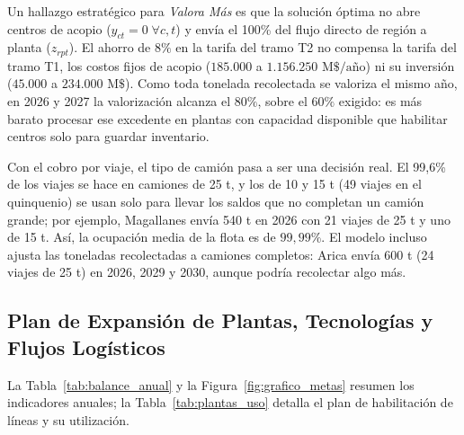 \documentclass[letterpaper]{article}
\begin{document}
Un hallazgo estratégico para \textit{Valora Más} es que la solución óptima no abre centros de acopio ($y_{ct}=0\;\forall c,t$) y envía el 100\% del flujo directo de región a planta ($z_{rpt}$). El ahorro de $8\%$ en la tarifa del tramo T2 no compensa la tarifa del tramo T1, los costos fijos de acopio ($185.000$ a $1.156.250\text{ M\$/año}$) ni su inversión ($45.000$ a $234.000\text{ M\$}$). Como toda tonelada recolectada se valoriza el mismo año, en 2026 y 2027 la valorización alcanza el $80\%$, sobre el $60\%$ exigido: es más barato procesar ese excedente en plantas con capacidad disponible que habilitar centros solo para guardar inventario.

Con el cobro por viaje, el tipo de camión pasa a ser una decisión real. El 99,6\% de los viajes se hace en camiones de 25 t, y los de 10 y 15 t (49 viajes en el quinquenio) se usan solo para llevar los saldos que no completan un camión grande; por ejemplo, Magallanes envía 540 t en 2026 con 21 viajes de 25 t y uno de 15 t. Así, la ocupación media de la flota es de $99,99\%$. El modelo incluso ajusta las toneladas recolectadas a camiones completos: Arica envía 600 t (24 viajes de 25 t) en 2026, 2029 y 2030, aunque podría recolectar algo más.

\subsection{Plan de Expansión de Plantas, Tecnologías y Flujos Logísticos}

La Tabla~\ref{tab:balance_anual} y la Figura~\ref{fig:grafico_metas} resumen los indicadores anuales; la Tabla~\ref{tab:plantas_uso} detalla el plan de habilitación de líneas y su utilización.
\end{document}
